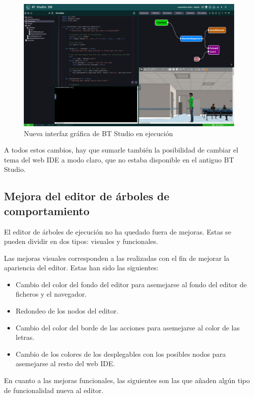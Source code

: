 \begin{figure}[H]
    \centering
    \includegraphics[width=\textwidth]{figures/bt-avances/bt-new-exec.png}
    \caption{Nueva interfaz gráfica de BT Studio en ejecución}
    \label{fig:bt-int-exec}
\end{figure}

A todos estos cambios, hay que sumarle también la posibilidad de cambiar el tema del web IDE a modo claro, que no estaba disponible en el antiguo BT Studio.

\subsection{Mejora del editor de árboles de comportamiento}\label{sec:bt-tree}

El editor de árboles de ejecución no ha quedado fuera de mejoras. Estas se pueden dividir en dos tipos: visuales y funcionales.

Las mejoras visuales corresponden a las realizadas con el fin de mejorar la apariencia del editor. Estas han sido las siguientes:

\begin{itemize}
    \item Cambio del color del fondo del editor para asemejarse al fondo del editor de ficheros y el navegador.
    \item Redondeo de los nodos del editor.
    \item Cambio del color del borde de las acciones para asemejarse al color de las letras.
    \item Cambio de los colores de los desplegables con los posibles nodos para asemejarse al resto del web IDE.
\end{itemize}

En cuanto a las mejoras funcionales, las siguientes son las que añaden algún tipo de funcionalidad nueva al editor. 

